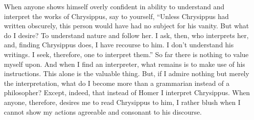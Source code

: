 When anyone shows himself overly confident in ability to understand
and interpret the works of Chrysippus, say to yourself, ``Unless Chrysippus
had written obscurely, this person would have had no subject for his
vanity. But what do I desire? To understand nature and follow her.
I ask, then, who interprets her, and, finding Chrysippus does, I have
recourse to him. I don't understand his writings. I seek, therefore,
one to interpret them.'' So far there is nothing to value myself upon.
And when I find an interpreter, what remains is to make use of his
instructions. This alone is the valuable thing. But, if I admire nothing
but merely the interpretation, what do I become more than a grammarian
instead of a philosopher? Except, indeed, that instead of Homer I
interpret Chrysippus. When anyone, therefore, desires me to read Chrysippus
to him, I rather blush when I cannot show my actions agreeable and
consonant to his discourse. 
